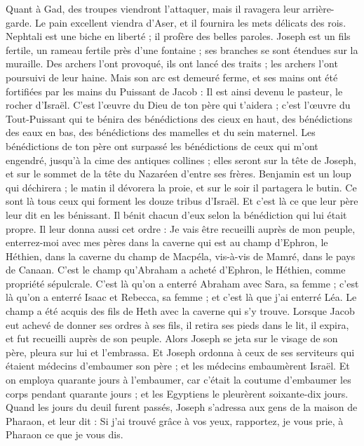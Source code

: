 \begin{multicols}{2}
Quant à Gad, des troupes viendront l’attaquer, mais il ravagera leur arrière-garde.
Le pain excellent viendra d'Aser, et il fournira les mets délicats des rois.
Nephtali est une biche en liberté ; il profère des belles paroles.
Joseph est un fils fertile, un rameau fertile près d'une fontaine ; ses branches se sont étendues sur la muraille.
Des archers l’ont provoqué, ils ont lancé des traits ; les archers l’ont poursuivi de leur haine.
Mais son arc est demeuré ferme, et ses mains ont été fortifiées par les mains du Puissant de Jacob : Il est ainsi devenu le pasteur, le rocher d’Israël.
C’est l’œuvre du Dieu de ton père qui t’aidera ; c’est l’œuvre du Tout-Puissant qui te bénira des bénédictions des cieux en haut, des bénédictions des eaux en bas, des bénédictions des mamelles et du sein maternel.
Les bénédictions de ton père ont surpassé les bénédictions de ceux qui m'ont engendré, jusqu'à la cime des antiques collines ; elles seront sur la tête de Joseph, et sur le sommet de la tête du Nazaréen d'entre ses frères.
Benjamin est un loup qui déchirera ; le matin il dévorera la proie, et sur le soir il partagera le butin.
Ce sont là tous ceux qui forment les douze tribus d'Israël.  Et c’est là ce que leur père leur dit en les bénissant. Il bénit chacun d'eux selon la bénédiction qui lui était propre.
Il leur donna aussi cet ordre : Je vais être recueilli auprès de mon peuple, enterrez-moi avec mes pères dans la caverne qui est au champ d'Ephron, le Héthien,
dans la caverne du champ de Macpéla, vis-à-vis de Mamré, dans le pays de Canaan. C’est le champ qu’Abraham a acheté d’Ephron, le Héthien, comme propriété sépulcrale.
C'est là qu'on a enterré Abraham avec Sara, sa femme ; c'est là qu'on a enterré Isaac et Rebecca, sa femme ; et c'est là que j'ai enterré Léa.
Le champ a été acquis des fils de Heth avec la caverne qui s’y trouve.
Lorsque Jacob eut achevé de donner ses ordres à ses fils, il retira ses pieds dans le lit, il expira, et fut recueilli auprès de son peuple.
\VerseOne{}Alors Joseph se jeta sur le visage de son père, pleura sur lui et l’embrassa.
Et Joseph ordonna à ceux de ses serviteurs qui étaient médecins d'embaumer son père ; et les médecins embaumèrent Israël.
Et on employa quarante jours à l'embaumer, car c'était la coutume d'embaumer les corps pendant quarante jours ; et les Egyptiens le pleurèrent soixante-dix jours.
Quand les jours du deuil furent passés, Joseph s’adressa aux gens de la maison de Pharaon, et leur dit : Si j’ai trouvé grâce à vos yeux, rapportez, je vous prie, à Pharaon ce que je vous dis.

\end{multicols}
